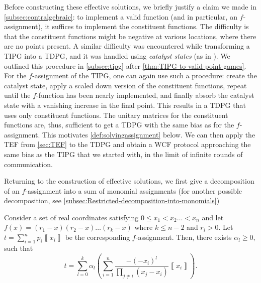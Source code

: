 \documentclass{theoretics}
\begin{document}
Before constructing these effective solutions, we briefly justify a claim we made in \cref{subsec:contralgebraic}: to implement a valid function (and in particular, an $f$-assignment), it suffices to implement the constituent  functions. The difficulty is that the constituent functions
might be negative at various locations, where there are
no points present. A similar difficulty was encountered while transforming a TIPG into a TDPG, and it was
handled using \emph{catalyst states} %
(as in \cite{Mochon07,ACG+14}). We outlined this procedure in \cref{subsec:tipg} after \cref{thm:TIPG-to-valid-point-games}.
%
For the $f$-assignment of the TIPG,  one can again use such a procedure: create the catalyst state, apply a scaled down version of the constituent functions, repeat until the $f$-function has been nearly implemented, and finally absorb the catalyst state with a vanishing increase in the final point. This results in a TDPG that uses only constituent functions.
%
%
%
%
%
The unitary matrices for the constituent functions are, thus, sufficient to get a TDPG with the same bias as for the $f$-assignment.  This motivates \cref{def:solvingassignment} below. We can then apply the TEF from \cref{sec:TEF} to the TDPG and obtain a WCF protocol
approaching the same bias as the TIPG that we started
with, in the limit of infinite rounds of communication. %

%
%
%


%
%
%
%
%
%
%
%
%
%
%
%

Returning to the construction of effective solutions, we first give a decomposition of an $f$-assignment into a sum of monomial assignments (for another possible decomposition, see \cref{subsec:Restricted-decomposition-into-monomials})
%
%
%

\begin{lemma}
  Consider a set of real coordinates satisfying $0\le x_{1}<x_{2}\dots<x_{n}$
  and let $f(x)=(r_{1}-x)(r_{2}-x)\dots(r_{k}-x)$ where $k\le n-2$ and $r_i>0$.
  Let $t=\sum_{i=1}^{n}p_{i}\left\llbracket x_{i}\right\rrbracket $
  be the corresponding $f$-assignment. Then, there exists $\alpha_{l}\ge0$, such that
  $$
    t=\sum_{l=0}^{k}\alpha_{l}\left(\sum_{i=1}^{n}\frac{-(-x_{i})^{l}}{\prod_{j\neq i}(x_{j}-x_{i})}\left\llbracket x_{i}\right\rrbracket \right).
  $$

  \label{lem:generalMonomialDecomposition}
\end{lemma}
\end{document}

